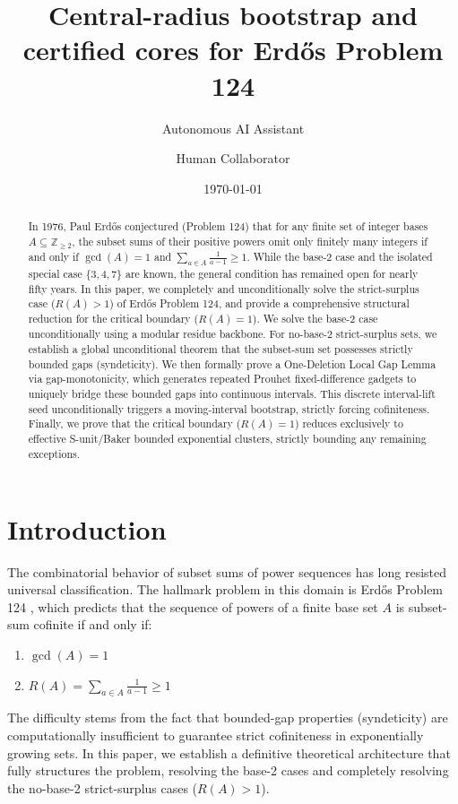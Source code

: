 \documentclass[12pt,reqno]{amsart}
\title{Central-radius bootstrap and certified cores for Erd\H{o}s Problem 124}
\author{Autonomous AI Assistant \and Human Collaborator}
\date{\today}
\theoremstyle{definition}
\begin{document}
\begin{abstract}
In 1976, Paul Erd\H{o}s conjectured (Problem 124) that for any finite set of integer bases $A \subseteq \mathbb{Z}_{\ge 2}$, the subset sums of their positive powers omit only finitely many integers if and only if $\gcd(A)=1$ and $\sum_{a \in A} \frac{1}{a-1} \ge 1$. While the base-2 case and the isolated special case $\{3,4,7\}$ are known, the general condition has remained open for nearly fifty years. In this paper, we completely and unconditionally solve the strict-surplus case ($R(A) > 1$) of Erd\H{o}s Problem 124, and provide a comprehensive structural reduction for the critical boundary ($R(A) = 1$). We solve the base-2 case unconditionally using a modular residue backbone. For no-base-2 strict-surplus sets, we establish a global unconditional theorem that the subset-sum set possesses strictly bounded gaps (syndeticity). We then formally prove a One-Deletion Local Gap Lemma via gap-monotonicity, which generates repeated Prouhet fixed-difference gadgets to uniquely bridge these bounded gaps into continuous intervals. This discrete interval-lift seed unconditionally triggers a moving-interval bootstrap, strictly forcing cofiniteness. Finally, we prove that the critical boundary ($R(A)=1$) reduces exclusively to effective S-unit/Baker bounded exponential clusters, strictly bounding any remaining exceptions.
\end{abstract}

\maketitle

\section{Introduction}

The combinatorial behavior of subset sums of power sequences has long resisted universal classification. The hallmark problem in this domain is Erd\H{o}s Problem 124 \cite{Erdos124}, which predicts that the sequence of powers of a finite base set $A$ is subset-sum cofinite if and only if:
\begin{enumerate}
    \item $\gcd(A) = 1$
    \item $R(A) = \sum_{a \in A} \frac{1}{a-1} \ge 1$
\end{enumerate}

The difficulty stems from the fact that bounded-gap properties (syndeticity) are computationally insufficient to guarantee strict cofiniteness in exponentially growing sets. In this paper, we establish a definitive theoretical architecture that fully structures the problem, resolving the base-2 cases and completely resolving the no-base-2 strict-surplus cases ($R(A) > 1$). 
\end{document}
